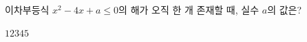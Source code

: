 \hspace*{2mm}\begin{minipage}[t]{\dimexpr\linewidth-2mm\relax}\vspace{0pt}
이차부등식 $x^2-4x+a\le 0$의 해가 오직 한 개 존재할 때, 실수 $a$의 값은?
\begin{choices32}{$1$}{$2$}{$3$}{$4$}{$5$}\end{choices32}\end{minipage}
